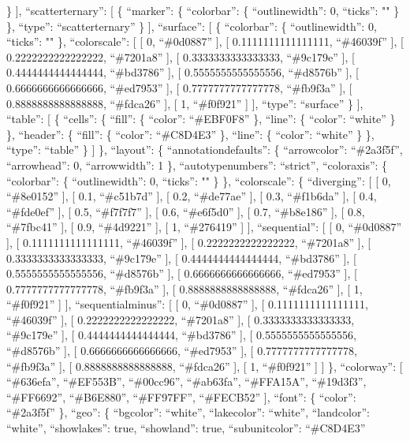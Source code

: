 \documentclass[
]{article}
\begin{document}
\} {]}, ``scatterternary'': {[} \{ ``marker'': \{ ``colorbar'': \{
``outlinewidth'': 0, ``ticks'': "" \} \}, ``type'': ``scatterternary''
\} {]}, ``surface'': {[} \{ ``colorbar'': \{ ``outlinewidth'': 0,
``ticks'': "" \}, ``colorscale'': {[} {[} 0, ``\#0d0887'' {]}, {[}
0.1111111111111111, ``\#46039f'' {]}, {[} 0.2222222222222222,
``\#7201a8'' {]}, {[} 0.3333333333333333, ``\#9c179e'' {]}, {[}
0.4444444444444444, ``\#bd3786'' {]}, {[} 0.5555555555555556,
``\#d8576b'' {]}, {[} 0.6666666666666666, ``\#ed7953'' {]}, {[}
0.7777777777777778, ``\#fb9f3a'' {]}, {[} 0.8888888888888888,
``\#fdca26'' {]}, {[} 1, ``\#f0f921'' {]} {]}, ``type'': ``surface'' \}
{]}, ``table'': {[} \{ ``cells'': \{ ``fill'': \{ ``color'':
``\#EBF0F8'' \}, ``line'': \{ ``color'': ``white'' \} \}, ``header'': \{
``fill'': \{ ``color'': ``\#C8D4E3'' \}, ``line'': \{ ``color'':
``white'' \} \}, ``type'': ``table'' \} {]} \}, ``layout'': \{
``annotationdefaults'': \{ ``arrowcolor'': ``\#2a3f5f'', ``arrowhead'':
0, ``arrowwidth'': 1 \}, ``autotypenumbers'': ``strict'', ``coloraxis'':
\{ ``colorbar'': \{ ``outlinewidth'': 0, ``ticks'': "" \} \},
``colorscale'': \{ ``diverging'': {[} {[} 0, ``\#8e0152'' {]}, {[} 0.1,
``\#c51b7d'' {]}, {[} 0.2, ``\#de77ae'' {]}, {[} 0.3, ``\#f1b6da'' {]},
{[} 0.4, ``\#fde0ef'' {]}, {[} 0.5, ``\#f7f7f7'' {]}, {[} 0.6,
``\#e6f5d0'' {]}, {[} 0.7, ``\#b8e186'' {]}, {[} 0.8, ``\#7fbc41'' {]},
{[} 0.9, ``\#4d9221'' {]}, {[} 1, ``\#276419'' {]} {]}, ``sequential'':
{[} {[} 0, ``\#0d0887'' {]}, {[} 0.1111111111111111, ``\#46039f'' {]},
{[} 0.2222222222222222, ``\#7201a8'' {]}, {[} 0.3333333333333333,
``\#9c179e'' {]}, {[} 0.4444444444444444, ``\#bd3786'' {]}, {[}
0.5555555555555556, ``\#d8576b'' {]}, {[} 0.6666666666666666,
``\#ed7953'' {]}, {[} 0.7777777777777778, ``\#fb9f3a'' {]}, {[}
0.8888888888888888, ``\#fdca26'' {]}, {[} 1, ``\#f0f921'' {]} {]},
``sequentialminus'': {[} {[} 0, ``\#0d0887'' {]}, {[}
0.1111111111111111, ``\#46039f'' {]}, {[} 0.2222222222222222,
``\#7201a8'' {]}, {[} 0.3333333333333333, ``\#9c179e'' {]}, {[}
0.4444444444444444, ``\#bd3786'' {]}, {[} 0.5555555555555556,
``\#d8576b'' {]}, {[} 0.6666666666666666, ``\#ed7953'' {]}, {[}
0.7777777777777778, ``\#fb9f3a'' {]}, {[} 0.8888888888888888,
``\#fdca26'' {]}, {[} 1, ``\#f0f921'' {]} {]} \}, ``colorway'': {[}
``\#636efa'', ``\#EF553B'', ``\#00cc96'', ``\#ab63fa'', ``\#FFA15A'',
``\#19d3f3'', ``\#FF6692'', ``\#B6E880'', ``\#FF97FF'', ``\#FECB52''
{]}, ``font'': \{ ``color'': ``\#2a3f5f'' \}, ``geo'': \{ ``bgcolor'':
``white'', ``lakecolor'': ``white'', ``landcolor'': ``white'',
``showlakes'': true, ``showland'': true, ``subunitcolor'': ``\#C8D4E3''
\end{document}

